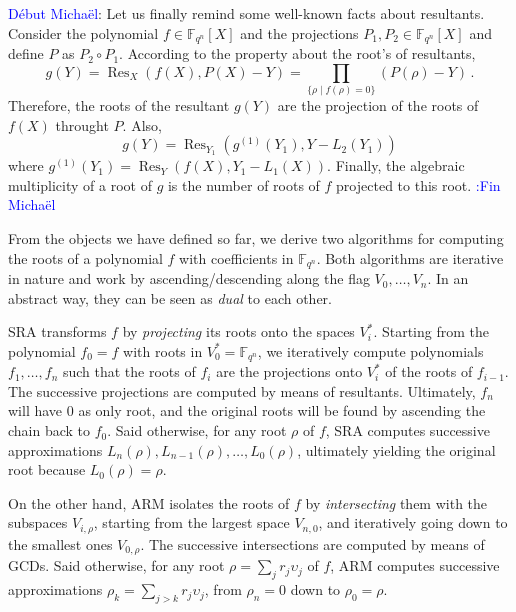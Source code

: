 \documentclass{sig-alternate}
\newcommand{\ff}[1]{\mathbb{F}_{#1}}
\newcommand{\qq}{q}
\newcommand{\nn}{n}
\newcommand{\qn}{{\qq^\nn}}
\newcommand{\extf}{\ff{\qn}}
\DeclareMathOperator{\Res}{Res}
\newcounter{algo}
\newcommand{\comd}{\noindent \textcolor{blue}{D\'ebut Micha\"el}:}
\newcommand{\comf}{\noindent \textcolor{blue}{:Fin Micha\"el}}
\renewcommand{\paragraph}[1]{\smallskip\noindent{{\bf \rm #1.}}}
\begin{document}
\comd
Let us finally remind some well-known facts about resultants.
Consider the polynomial $f \in \extf[X]$ and the projections $P_1, P_2 \in  \extf[X]$ and define $P$ as $P_2 \circ P_1$.
According to the property about the root's of resultants,
$$g(Y)=\Res_X(f(X),P(X)-Y)=\prod_{\{\rho \mid f(\rho)=0\}} (P(\rho)-Y) \,.$$
Therefore, the roots of the resultant $g(Y)$ are the projection of the roots of $f(X)$ throught $P$.
Also, 
\begin{equation}
\label{resultant_compose}
g(Y)=\Res_{Y_1}(g^{(1)}(Y_1),Y-L_2(Y_1))
\end{equation}
 where $g^{(1)}(Y_1)=\Res_{Y}(f(X),Y_1-L_1(X))$. Finally, 
 the algebraic multiplicity of a root of $g$ is the number of roots of $f$ projected to this root.
\comf



\paragraph{Application to root finding} From the objects we have
defined so far, we derive two algorithms for computing the roots of a
polynomial $f$ with coefficients in $\extf$. Both algorithms are
iterative in nature and work by ascending/de\-scend\-ing along the
flag $V_0,\dots,V_n$. In an abstract way, they can be seen as
\emph{dual} to each other.

SRA transforms $f$ by \emph{projecting} its roots onto the spaces
$V_i^\ast$.  Starting from the polynomial $f_0=f$ with roots in
$V_0^\ast=\extf$, we iteratively compute polynomials $f_1,\dots,f_n$
such that the roots of $f_i$ are the projections onto $V_i^\ast$ of
the roots of $f_{i-1}$.  The successive projections are computed by
means of resultants.  Ultimately, $f_n$ will have $0$ as only root,
and the original roots will be found by ascending the chain back to
$f_0$.  Said otherwise, for any root $\rho$ of $f$, SRA computes
successive approximations $L_n(\rho),L_{n-1}(\rho),\dots,L_0(\rho)$,
ultimately yielding the original root because $L_0(\rho)=\rho$.

On the other hand, ARM isolates the roots of $f$ by
\emph{intersecting} them with the subspaces $V_{i,\rho}$, starting
from the largest space $V_{n,0}$, and iteratively going down to the
smallest ones $V_{0,\rho}$.  The successive intersections are computed
by means of GCDs.  Said otherwise, for any root $\rho=\sum_j
r_j\upsilon_j$ of $f$, ARM computes successive approximations
$\rho_k=\sum_{j>k}r_j\upsilon_j$, from $\rho_n=0$ down to
$\rho_0=\rho$.
\end{document}
